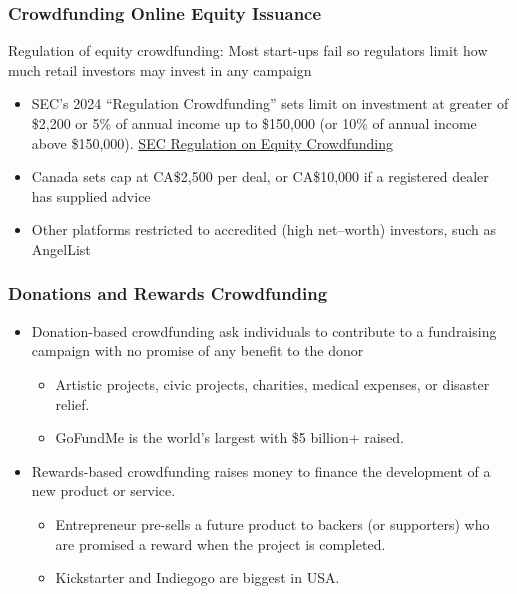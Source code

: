 \documentclass[aspectratio=169]{beamer}
\begin{document}
\begin{frame}
\frametitle{Crowdfunding Online Equity Issuance}


Regulation of equity crowdfunding: Most start-ups fail so regulators limit how much retail investors may invest in any campaign
\begin{itemize}
    \item SEC's 2024 ``Regulation Crowdfunding'' sets limit on investment at greater of \$2,200 or 5\% of annual income up to \$150,000 (or 10\% of annual income above \$150,000). \href{https://www.sec.gov/education/smallbusiness/exemptofferings/regcrowdfunding}{SEC Regulation on Equity Crowdfunding}
    \item Canada sets cap at CA\$2,500 per deal, or CA\$10,000 if a registered dealer has supplied advice
    \item Other platforms restricted to accredited (high net–worth) investors, such as AngelList
\end{itemize}


\end{frame} 













\begin{frame}
\frametitle{Donations and Rewards Crowdfunding}


\begin{itemize}
    \item Donation-based crowdfunding ask individuals to contribute to a fundraising campaign with no promise of any benefit to the donor
    \begin{itemize}
        \item Artistic projects, civic projects, charities, medical expenses, or disaster relief.
        \smallskip 
        \item GoFundMe is the world's largest with \$5 billion+ raised.
    \end{itemize}
    \medskip 
    \item Rewards-based crowdfunding raises money to finance the development of a new product or service. 
    \begin{itemize}
        \item Entrepreneur pre-sells a future product to backers (or supporters) who are promised a reward when the project is completed.
        \smallskip
        \item Kickstarter and Indiegogo are biggest in USA.
    \end{itemize}
\end{itemize}



\end{frame} 
\end{document}
